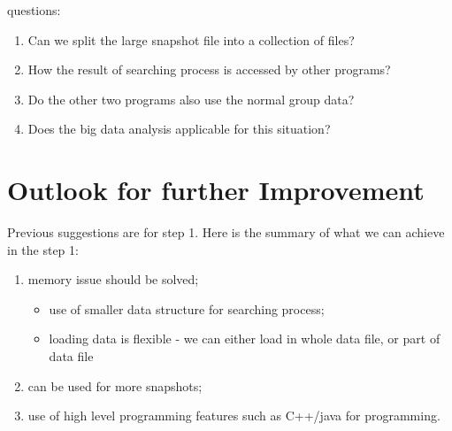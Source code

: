 \documentclass[notheorems, aspectratio=54]{beamer}
\begin{document}
\begin{frame}[fragile]

\begin{block}{questions:}
 \begin{enumerate}
  \item Can we split the large snapshot file into a collection of files?
  \item How the result of searching process is accessed by other programs?
  \item Do the other two programs also use the normal group data?
  \item Does the big data analysis applicable for this situation?
 \end{enumerate}
\end{block}

\end{frame}

\section{Outlook for further Improvement}
\begin{frame}[fragile]

Previous suggestions are for step 1. Here is the summary of what we can achieve in the 
step 1:
 \begin{enumerate}
  \item memory issue should be solved;
  \begin{itemize}
   \item use of smaller data structure for searching process;
   \item loading data is flexible - we can either load in whole data file, or part of 
   data file
  \end{itemize}
  \item can be used for more snapshots; 
  \item use of high level programming features such as C++/java for programming.
 \end{enumerate}

\end{frame}
\end{document}
